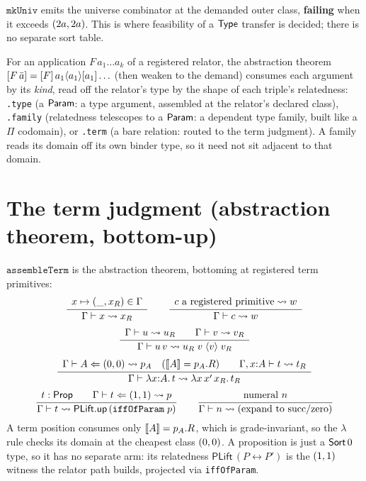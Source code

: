 \begin{definition}
  \label{def:mk-univ}
  \leanok
  $\texttt{mkUniv}$ emits the universe combinator at the demanded outer class,
  \textbf{failing} when it exceeds $(2a,2a)$. This is where feasibility of a
  $\mathsf{Type}$ transfer is decided; there is no separate sort table.
\end{definition}

\begin{definition}
  \label{def:arg-kind}
  \leanok
  For an application $F\,a_1\ldots a_k$ of a registered relator, the abstraction
  theorem $[ F\,\bar a ] = [ F ]\,a_1\langle a_1 \rangle[ a_1 ]\ldots$ (then weaken to
  the demand) consumes each argument by its \emph{kind}, read off the relator's
  type by the shape of each triple's relatedness: \texttt{.type} (a $\mathsf{Param}$: a
  type argument, assembled at the relator's declared class), \texttt{.family}
  (relatedness telescopes to a $\mathsf{Param}$: a dependent type family, built like a
  $\Pi$ codomain), or \texttt{.term} (a bare relation: routed to the term
  judgment). A family reads its domain off its own binder type, so it need not
  sit adjacent to that domain.
\end{definition}

\section{The term judgment (abstraction theorem, bottom-up)}
\label{sec:term-rules}

\begin{definition}
  \label{def:assemble-term}
  \leanok
  $\texttt{assembleTerm}$ is the abstraction theorem, bottoming at registered
  term primitives:
  \[
    \dfrac{\begin{array}{c} x \mapsto (\_, x_R) \in \Gamma \end{array}}{ \Gamma \vdash x \rightsquigarrow x_R }
    \qquad
    \dfrac{\begin{array}{c} c\ \text{a registered primitive} \rightsquigarrow w \end{array}}{ \Gamma \vdash c \rightsquigarrow w }
  \]
  \[
    \dfrac{\begin{array}{c} \Gamma \vdash u \rightsquigarrow u_R \qquad \Gamma \vdash v \rightsquigarrow v_R \end{array}}{ \Gamma \vdash u\,v \rightsquigarrow u_R\; v\; \langle v \rangle\; v_R }
  \]
  \[
    \dfrac{\begin{array}{c} \Gamma \vdash A \Leftarrow (0,0) \rightsquigarrow p_A \quad ([\![ A ]\!] = p_A.R) \qquad \Gamma, x{:}A \vdash t \rightsquigarrow t_R \end{array}}{ \Gamma \vdash \lambda x{:}A.\,t \rightsquigarrow \lambda x\,x'\,x_R.\,t_R }
  \]
  \[
    \dfrac{\begin{array}{c} t : \mathsf{Prop} \qquad \Gamma \vdash t \Leftarrow (1,1) \rightsquigarrow p \end{array}}{ \Gamma \vdash t \rightsquigarrow \mathsf{PLift.up}\,(\texttt{iffOfParam}\;p) }
    \qquad
    \dfrac{\begin{array}{c} \text{numeral } n \end{array}}{ \Gamma \vdash n \rightsquigarrow (\text{expand to succ/zero}) }
  \]
  A term position consumes only $[\![ A ]\!] = p_A.R$, which is grade-invariant, so
  the $\lambda$ rule checks its domain at the cheapest class $(0,0)$. A
  proposition is just a $\mathsf{Sort}\,0$ type, so it has no separate arm: its
  relatedness $\mathsf{PLift}\,(P \leftrightarrow P')$ is the $(1,1)$ witness
  the relator path builds, projected via \texttt{iffOfParam}.
\end{definition}

